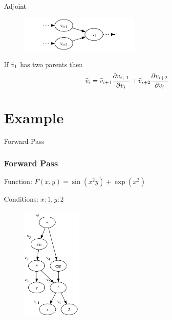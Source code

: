 \documentclass{beamer}
\begin{document}
\begin{frame}{Adjoint}
    \begin{figure}
        \centering
        \includegraphics[width=6cm]{images/Graph_simple_parent.pdf}
    \end{figure}
    If $\Bar{v}_1$ has two parents then
    \begin{equation*}
        \Bar{v}_i = \Bar{v}_{i+1} \frac{\partial v_{i+1}}{\partial v_i} + \Bar{v}_{i+2} \frac{\partial v_{i+2}}{\partial v_i}
    \end{equation*}
\end{frame}


\section{Example}

\begin{frame}{Forward Pass}
\frametitle{Forward Pass}
Function: $F(x, y) = \sin(x^2 y) + \exp(x^2)$

Conditions: ${x:1, y:2}$
\begin{figure}[h!]
    \includegraphics[width=3cm]{images/Graph_simple_example.pdf}
    \label{fig:DAGgraph}
\end{figure}

\end{frame}
\end{document}
